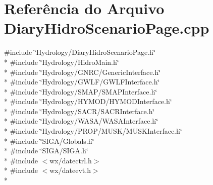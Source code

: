 \section{Referência do Arquivo Diary\+Hidro\+Scenario\+Page.\+cpp}
\label{_diary_hidro_scenario_page_8cpp}
{\ttfamily \#include \char`\"{}Hydrology/\+Diary\+Hidro\+Scenario\+Page.\+h\char`\"{}}\\*
{\ttfamily \#include \char`\"{}Hydrology/\+Hidro\+Main.\+h\char`\"{}}\\*
{\ttfamily \#include \char`\"{}Hydrology/\+G\+N\+R\+C/\+Generic\+Interface.\+h\char`\"{}}\\*
{\ttfamily \#include \char`\"{}Hydrology/\+G\+W\+L\+F/\+G\+W\+L\+F\+Interface.\+h\char`\"{}}\\*
{\ttfamily \#include \char`\"{}Hydrology/\+S\+M\+A\+P/\+S\+M\+A\+P\+Interface.\+h\char`\"{}}\\*
{\ttfamily \#include \char`\"{}Hydrology/\+H\+Y\+M\+O\+D/\+H\+Y\+M\+O\+D\+Interface.\+h\char`\"{}}\\*
{\ttfamily \#include \char`\"{}Hydrology/\+S\+A\+C\+R/\+S\+A\+C\+R\+Interface.\+h\char`\"{}}\\*
{\ttfamily \#include \char`\"{}Hydrology/\+W\+A\+S\+A/\+W\+A\+S\+A\+Interface.\+h\char`\"{}}\\*
{\ttfamily \#include \char`\"{}Hydrology/\+P\+R\+O\+P/\+M\+U\+S\+K/\+M\+U\+S\+K\+Interface.\+h\char`\"{}}\\*
{\ttfamily \#include \char`\"{}S\+I\+G\+A/\+Globals.\+h\char`\"{}}\\*
{\ttfamily \#include \char`\"{}S\+I\+G\+A/\+S\+I\+G\+A.\+h\char`\"{}}\\*
{\ttfamily \#include $<$wx/datectrl.\+h$>$}\\*
{\ttfamily \#include $<$wx/dateevt.\+h$>$}\\*
